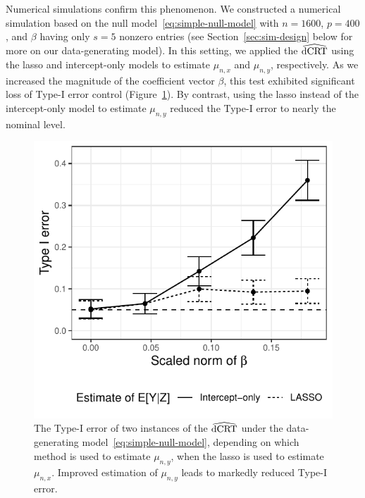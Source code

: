 \documentclass[12pt]{article}
\theoremstyle{definition}
\theoremstyle{remark}
\newcommand{\dCRThat}{\widehat{\textnormal{dCRT}}}		%
\begin{document}
	Numerical simulations confirm this phenomenon. We constructed a numerical simulation based on the null model~\eqref{eq:simple-null-model} with $n = 1600$,  $p = 400$, and $\beta$ having only $s = 5$ nonzero entries (see Section~\ref{sec:sim-design} below for more on our data-generating model). In this setting, we applied the $\dCRThat$ using the lasso and intercept-only models to estimate $\mu_{n,x}$ and $\mu_{n,y}$, respectively. As we increased the magnitude of the coefficient vector $\beta$, this test exhibited significant loss of Type-I error control (Figure~\ref{fig:negative_Result}). By contrast, using the lasso instead of the intercept-only model to estimate $\mu_{n,y}$ reduced the Type-I error to nearly the nominal level.
	\begin{figure}[!ht]
		\centering
		\includegraphics[scale = 1]{figures/negative_result_dCRT.pdf}
		\caption{The Type-I error of two instances of the $\dCRThat$ under the data-generating model~\eqref{eq:simple-null-model}, depending on which method is used to estimate $\mu_{n,y}$, when the lasso is used to estimate $\mu_{n,x}$. Improved estimation of $\mu_{n,y}$ leads to markedly reduced Type-I error.}
		\label{fig:negative_Result}
	\end{figure}
	
\end{document}
